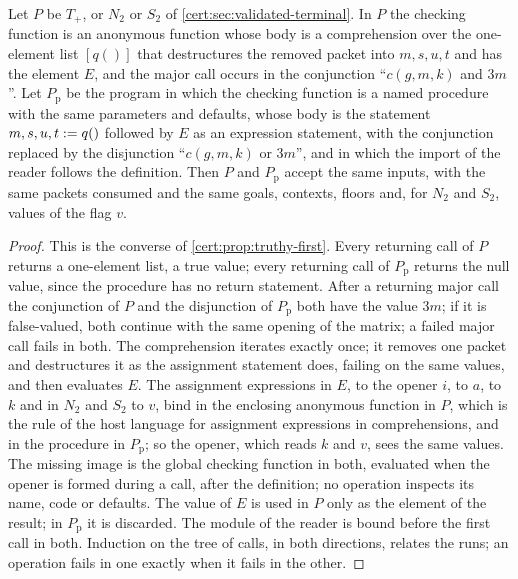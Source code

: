 \begin{proposition}\label{cert:prop:procedure}
Let $P$ be $T_{+}$, or $N_2$ or $S_2$ of \cref{cert:sec:validated-terminal}. In $P$
the checking function is an anonymous function whose body is a comprehension over
the one-element list $[q()]$ that destructures the removed packet into $m,s,u,t$
and has the element $E$, and the major call occurs in the conjunction
``$c(g,m,k)$ and $3m$''. Let $P_{\mathrm p}$ be the program in which the checking
function is a named procedure with the same parameters and defaults, whose body
is the statement $m,s,u,t\mathrel{:=} q()$ followed by $E$ as an expression statement,
with the conjunction replaced by the disjunction ``$c(g,m,k)$ or $3m$'', and in
which the import of the reader follows the definition. Then $P$ and
$P_{\mathrm p}$ accept the same inputs, with the same packets consumed and the
same goals, contexts, floors and, for $N_2$ and $S_2$, values of the flag $v$.
\end{proposition}
\begin{proof}
This is the converse of \cref{cert:prop:truthy-first}. Every returning call of
$P$ returns a one-element list, a true value; every returning call of
$P_{\mathrm p}$ returns the null value, since the procedure has no return
statement. After a returning major call the conjunction of $P$ and the
disjunction of $P_{\mathrm p}$ both have the value $3m$; if it is false-valued,
both continue with the same opening of the matrix; a failed major call fails in
both. The comprehension iterates exactly once; it removes one packet and
destructures it as the assignment statement does, failing on the same values,
and then evaluates $E$. The assignment expressions in $E$, to the opener $i$, to
$a$, to $k$ and in $N_2$ and $S_2$ to $v$, bind in the enclosing anonymous
function in $P$, which is the rule of the host language for assignment
expressions in comprehensions, and in the procedure in $P_{\mathrm p}$; so the
opener, which reads $k$ and $v$, sees the same values. The missing image is the
global checking function in both, evaluated when the opener is formed during a
call, after the definition; no operation inspects its name, code or defaults. The
value of $E$ is used in $P$ only as the element of the result; in $P_{\mathrm p}$
it is discarded. The module of the reader is bound before the first call in
both. Induction on the tree of calls, in both directions, relates the runs; an
operation fails in one exactly when it fails in the other.
\end{proof}


